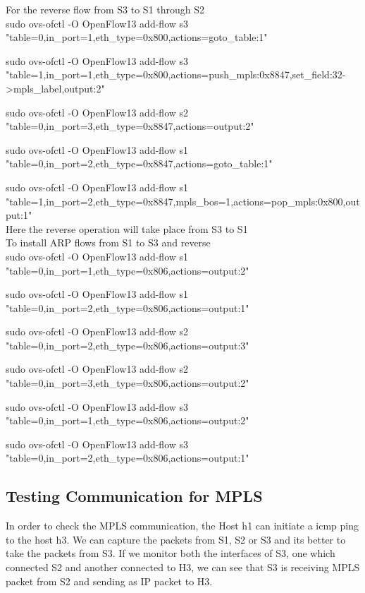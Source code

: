 For the reverse flow from S3 to S1 through S2 \\

sudo ovs-ofctl -O OpenFlow13 add-flow s3 "table=0,in_port=1,eth_type=0x800,actions=goto_table:1" 

sudo ovs-ofctl -O OpenFlow13 add-flow s3 "table=1,in_port=1,eth_type=0x800,actions=push_mpls:0x8847,set_field:32->mpls_label,output:2" 

sudo ovs-ofctl -O OpenFlow13 add-flow s2 "table=0,in_port=3,eth_type=0x8847,actions=output:2" 

sudo ovs-ofctl -O OpenFlow13 add-flow s1 "table=0,in_port=2,eth_type=0x8847,actions=goto_table:1" 

sudo ovs-ofctl -O OpenFlow13 add-flow s1 "table=1,in_port=2,eth_type=0x8847,mpls_bos=1,actions=pop_mpls:0x800,output:1"\\


Here the reverse operation will take place from S3 to S1\\

To install ARP flows from S1 to S3 and reverse\\

sudo ovs-ofctl -O OpenFlow13 add-flow s1 "table=0,in_port=1,eth_type=0x806,actions=output:2" 

sudo ovs-ofctl -O OpenFlow13 add-flow s1 "table=0,in_port=2,eth_type=0x806,actions=output:1" 

sudo ovs-ofctl -O OpenFlow13 add-flow s2 "table=0,in_port=2,eth_type=0x806,actions=output:3" 

sudo ovs-ofctl -O OpenFlow13 add-flow s2 "table=0,in_port=3,eth_type=0x806,actions=output:2" 

sudo ovs-ofctl -O OpenFlow13 add-flow s3 "table=0,in_port=1,eth_type=0x806,actions=output:2" 

sudo ovs-ofctl -O OpenFlow13 add-flow s3 "table=0,in_port=2,eth_type=0x806,actions=output:1" 

 
\subsection{Testing Communication for MPLS}


In order to check the MPLS communication, the Host h1 can initiate a icmp ping to the host h3. We can capture the packets from S1, S2 or S3 and its better to take the packets from S3. If we monitor both the interfaces of S3, one which connected S2 and another connected to H3, we can see that S3 is receiving MPLS packet from S2 and sending as IP packet to H3. 

